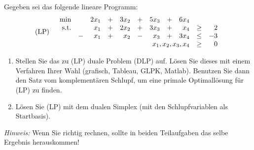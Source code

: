 \documentclass[11pt,german,a4paper,parskip=half-]{scrartcl}
\begin{document}
\maketitle

\begin{exercise}{4}
 Gegeben sei das folgende lineare Programm:
\[\text{(LP)}\quad\begin{array}{rcrcrcrcrcr}
\min && 2x_{1} &+& 3x_{2} &+& 5x_{3} &+& 6x_{4} \\
\text{s.t.} && x_{1} &+& 2x_{2} &+& 3x_{3} &+& x_{4} &\geq& 2\\
&-& x_{1} &+& x_{2} &-& x_{3} &+& 3x_{4} &\leq& -3 \\
&&&&& \multicolumn{4}{r}{x_{1},x_{2},x_{3},x_{4}}&\geq& 0
\end{array}\]
\begin{enumerate}
 \item Stellen Sie das zu (LP) duale Problem (DLP) auf. Lösen Sie dieses mit einem Verfahren Ihrer Wahl (grafisch, Tableau, GLPK, Matlab).
  Benutzen Sie dann den Satz vom komplementären Schlupf, um eine primale Optimallösung für (LP) zu finden.
 \item Lösen Sie (LP) mit dem dualen Simplex (mit den Schlupfvariablen als Startbasis).
\end{enumerate}
{\it Hinweis:} Wenn Sie richtig rechnen, sollte in beiden Teilaufgaben das selbe Ergebnis herauskommen!
\end{exercise}
\end{document}
